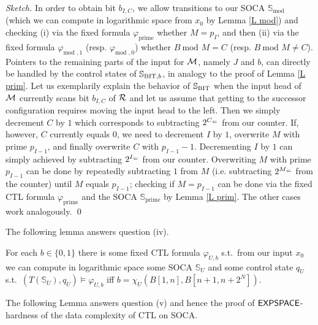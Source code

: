 \documentclass[times,envcountsame]{llncs}
\newcommand{\prim}{\text{prime}}
\renewcommand{\mod}{\text{mod }}
\newcommand{\Soca}{\mathbb{S}}
\begin{document}
\begin{proof}[Sketch]
In order to obtain bit $b_{I,C}$, we allow transitions to our SOCA $\Soca_\mod$
(which we can compute in logarithmic
space from $x_0$ by Lemma \ref{L mod}) and checking
(i) via the fixed formula $\varphi_\prim$ whether $M=p_I$, and
then (ii) via the fixed formula $\varphi_{\mod,1}$ (resp. $\varphi_{\mod,0}$)
 whether $B\ \mod M=C$ (resp. $B\ \mod M\not=C$).
Pointers to the remaining parts of the input for $\mathcal{M}$, namely $J$ and $b$,
can directly be handled by the control states of $\Soca_{\BIT,b}$,
in analogy to the proof of Lemma \ref{L prim}.
Let us exemplarily explain the behavior of $\Soca_{\BIT}$ when the input head
of $\mathcal{M}$ currently scans bit $b_{I,C}$ of $\mathcal{R}$ and let us assume that getting
to the successor configuration requires moving the input head to the left.
Then we simply decrement $C$ by $1$ which corresponds to subtracting $2^{C_\Leftarrow}$
from our counter. If, however, $C$ currently equals $0$, we need to
decrement $I$ by $1$, overwrite $M$ with prime $p_{I-1}$, and finally
overwrite $C$ with $p_{I-1}-1$. Decrementing $I$ by $1$ can simply achieved by
subtracting $2^{I_\Leftarrow}$ from our counter. Overwriting $M$ with prime $p_{I-1}$
can be done by repeatedly subtracting $1$ from $M$ (i.e. subtracting $2^{M_\Leftarrow}$
from the counter) until $M$ equals $p_{I-1}$;
checking if $M=p_{I-1}$ can be done via the fixed CTL formula $\varphi_{\prim}$
and the SOCA $\Soca_{\prim}$ by Lemma \ref{L prim}.
The other cases work analogously.
\qed
\end{proof}

\noindent
The following lemma answers question (iv).

\begin{lemma}{\label{L U}}
For each $b\in\{0,1\}$ there is some fixed CTL formula $\varphi_{U,b}$ s.t.\
from our input $x_0$
we can compute in logarithmic space some SOCA $\Soca_U$ and some
control state $q_U$ s.t.\ $(T(\Soca_U),q_U)\models\varphi_{U,b}$
iff $b=\chi_U(B[1,n],B[n+1,n+2^N])$.
\end{lemma}


\noindent
The following Lemma answers question (v) and hence the proof of
${\mathsf{EXPSPACE}}$-hardness of the data complexity of CTL on SOCA.
\end{document}
